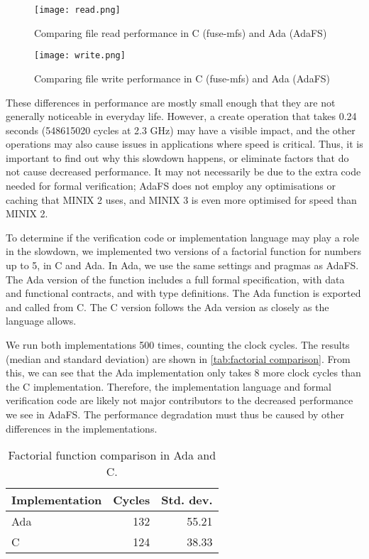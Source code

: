 \begin{figure}[h]
  \centering
  \texttt{[image: read.png]}
  \caption{Comparing file read performance in C (fuse-mfs) and Ada (AdaFS)}
  \label{fig:read comparison}
\end{figure}

\begin{figure}[h]
  \centering
  \texttt{[image: write.png]}
  \caption{Comparing file write performance in C (fuse-mfs) and Ada (AdaFS)}
  \label{fig:write comparison}
\end{figure}

These differences in performance are mostly small enough that they are not generally noticeable in everyday life.
However, a create operation that takes 0.24 seconds (548615020 cycles at 2.3 GHz) may have a visible impact, and the other operations may also cause issues in applications where speed is critical.
Thus, it is important to find out why this slowdown happens, or eliminate factors that do not cause decreased performance.
It may not necessarily be due to the extra code needed for formal verification; AdaFS does not employ any optimisations or caching that MINIX 2 uses, and MINIX 3 is even more optimised for speed than MINIX 2.

To determine if the verification code or implementation language may play a role in the slowdown, we implemented two versions of a factorial function for numbers up to 5, in C and Ada.
In Ada, we use the same settings and pragmas as AdaFS.
The Ada version of the function includes a full formal specification, with data and functional contracts, and with type definitions.
The Ada function is exported and called from C.
The C version follows the Ada version as closely as the language allows.

We run both implementations 500 times, counting the clock cycles.
The results (median and standard deviation) are shown in \autoref{tab:factorial comparison}.
From this, we can see that the Ada implementation only takes 8 more clock cycles than the C implementation.
Therefore, the implementation language and formal verification code are likely not major contributors to the decreased performance we see in AdaFS.
The performance degradation must thus be caused by other differences in the implementations.

\begin{table}[h]
  \centering
  \begin{tabular}{l | r | r}
    Implementation & Cycles & Std. dev. \\
    \hline \hline
    Ada            & 132    & 55.21     \\
    C              & 124    & 38.33
  \end{tabular}
  \caption{Factorial function comparison in Ada and C.}
  \label{tab:factorial comparison}
\end{table}
\clearpage

